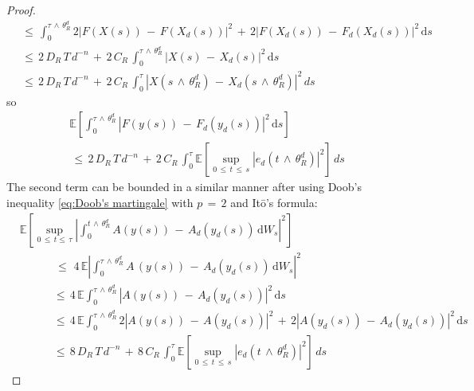 \begin{proof}
\begin{equation}
\begin{aligned}
            &\, {\leq} \,{\int}_0^{{\tau}\,{\wedge}\,{\theta}_R^d}2|F(X(s))\,-\,F(X_d(s))|^2\,+\,2|F(X_d(s)) \,-\, F_d(X_d(s))|^2\,\mathrm ds  \\
            &\, {\leq} \, 2\,D_R\,T\,d^{-n}\,+\,2\,C_R\,{\int}_0^{{\tau}\,{\wedge}\,{\theta}_R^d}|X(s)\,-\,X_d(s)|^2\,\mathrm ds \\
            &\, {\leq} \, 2\,D_R\,T\,d^{-n}\,+\,2\,C_R\,{\int}_0^{{\tau}}|X(s\,{\wedge}\, {\theta}_R^d)\,-\,X_d(s\,{\wedge}\, {\theta}_R^d)|^2\,ds
        \end{aligned}
    \end{equation}
    so
    \begin{multline}
        \mathbb E \left[ {\int}_0^{{\tau}\,{\wedge}\,{\theta}_R^d}|F(y(s))\,-\,F_d(y_d(s))|^2\,\mathrm ds\right] \\
        \, {\leq} \, 2\,D_R\,T\,d^{-n}\,+\,2\,C_R\,{\int}_0^{{\tau}}\mathbb
        E\left[\sup_{0\, {\leq} \,t\, {\leq} \,s}|e_d(t \,{\wedge}\, {\theta}_R^d)|^2\right]\,ds
        \label{eq:1st term main eq}
    \end{multline}
    The second term can be bounded in a similar manner after using Doob's
    inequality \eqref{eq:Doob's martingale} with $p\,=\,2$ and It\=o's formula:
    \begin{equation}
        \begin{aligned}
            & \mathbb E \left[\sup_{0\, {\leq} \,t {\leq} \,{\tau}} \left|{\int}_0^{t\,{\wedge}\,{\theta}_R^d}
                    A(y(s))\,-\,A_d(y_d(s)) \,\mathrm dW_s \right|^2\right] \\
            & \quad \quad \quad \, {\leq} \,\,4\,\mathbb E \left|{\int}_0^{{\tau}\,{\wedge}\,{\theta}_R^d}
                A\,(y(s))\,-\,A_d(y_d(s))\, \mathrm dW_s\right|^2 \\
            & \quad \quad \quad {\leq} \, 4 \,\mathbb E{\int}_0^{{\tau}\,{\wedge}\,{\theta}_R^d} |A(y(s))\,-\,A_d(y_d(s))|^2\,\mathrm ds \\
            & \quad \quad \quad {\leq} \,4\,\mathbb E{\int}_0^{{\tau}\,{\wedge}\,{\theta}_R^d}2|A(y(s))\,-\,A(y_d(s))|^2\,+\,2|A(y_d(s))
            \,-\, A_d(y_d(s))|^2\,\mathrm ds  \\
            & \quad \quad \quad  {\leq} \, 8\,D_R\,T \,d^{-n}\,+\,8\,C_R\,{\int}_0^{{\tau}}\mathbb
            E\left[\sup_{0\, {\leq} \,t\, {\leq} \,s}|e_d(t \,{\wedge}\, {\theta}_R^d)|^2\right]\,ds
        \end{aligned}
        \label{eq:2nd term main eq}
    \end{equation}

\end{proof}
